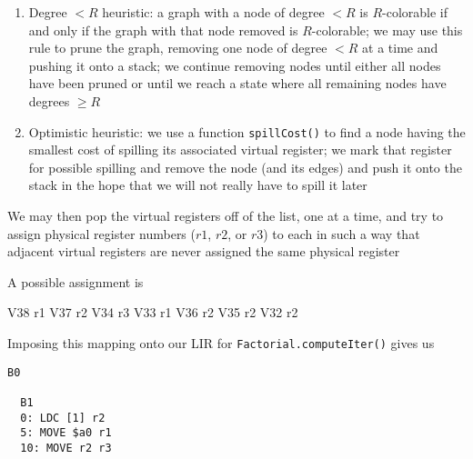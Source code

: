 \documentclass[8pt,a4paper,compress]{beamer}
\begin{document}
\begin{frame}[fragile]
\pause

\begin{enumerate}
\item Degree $< R$ heuristic: a graph with a node of degree $< R$ is $R$-colorable if and only if the graph with that node removed is $R$-colorable; we may use this rule to prune the graph, removing one node of degree $< R$ at a time and pushing it onto a stack; we continue removing nodes until either all nodes have been pruned or until we reach a state where all remaining nodes have degrees $\ge R$

\item Optimistic heuristic: we use a function \lstinline{spillCost()} to find a node having the smallest cost of spilling its associated virtual register; we mark that register for possible spilling and remove the node (and its edges) and push it onto the stack in the hope that we will not really have to spill it later
\end{enumerate}
\end{frame}

\begin{frame}[fragile]
\pause

Pruning of the above interference graph with $R = 3$ is shown below
\begin{center}
}
\end{center}
\end{frame}

\begin{frame}[fragile]
\pause

We may then pop the virtual registers off of the list, one at a time, and try to assign physical register numbers ($r1$, $r2$, or $r3$) to each in such a way that adjacent virtual registers are never assigned the same physical register

\pause
\bigskip

A possible assignment is
\begin{production}
    V38 r1
    V37 r2
    V34 r3
    V33 r1
    V36 r2
    V35 r2
    V32 r2
\end{production}

\pause

Imposing this mapping onto our LIR for \lstinline{Factorial.computeIter()} gives us
\begin{lstlisting}[language={}]
  B0

  B1
  0: LDC [1] r2
  5: MOVE $a0 r1
  10: MOVE r2 r3

\end{lstlisting}
\end{frame}
\end{document}
